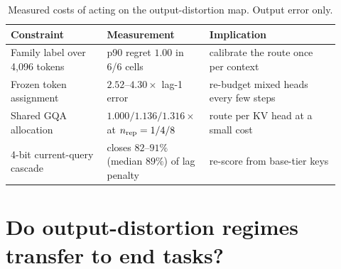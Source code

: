 \documentclass{article}
\theoremstyle{definition}
\begin{document}
\begin{table}[t]
\centering
\small
\setlength{\tabcolsep}{4pt}
\caption{Measured costs of acting on the output-distortion map. Output error only.}
\label{tab:deployment}
\begin{tabular}{@{}p{0.29\linewidth}p{0.25\linewidth}p{0.38\linewidth}@{}}
\toprule
\textbf{Constraint} & \textbf{Measurement} & \textbf{Implication} \\
\midrule
Family label over 4,096 tokens & p90 regret $1.00$ in 6/6 cells & calibrate the route once per context \\
Frozen token assignment & $2.52$--$4.30\times$ lag-1 error & re-budget mixed heads every few steps \\
Shared GQA allocation & $1.000/1.136/1.316\times$ at $n_{\rm rep}=1/4/8$ & route per KV head at a small cost \\
4-bit current-query cascade & closes $82$--$91\%$ (median $89\%$) of lag penalty & re-score from base-tier keys \\
\bottomrule
\end{tabular}
\vspace{-2mm}
\end{table}

\section{Do output-distortion regimes transfer to end tasks?}
\label{sec:endtask}
\end{document}
